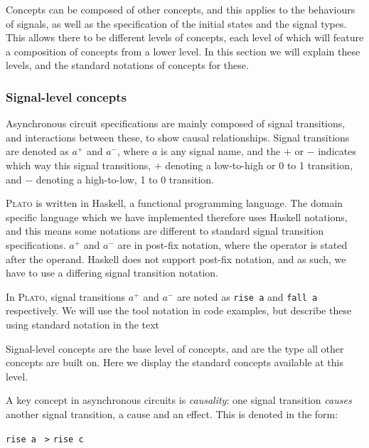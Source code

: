 \documentclass[british,conference,compsoc]{IEEEtran}
\newcommand{\noun}[1]{\textsc{#1}}
\begin{document}
Concepts can be composed of other concepts, and this applies to the behaviours 
of signals, as well as the specification of the initial states and the signal 
types. This allows there to be different levels of concepts, each level of 
which will feature a composition of concepts from a lower level. In this section we will explain these levels, and the standard notations of 
concepts for these. 

\vspace{-3mm}

\subsubsection{\label{signal-level}Signal-level concepts}Asynchronous circuit 
specifications are mainly composed of signal transitions, and interactions 
between these, to show causal relationships. Signal transitions are denoted as 
$a^{+}$ and $a^{-}$, where $a$ is any signal name, and 
the $+$ or $-$ indicates which way this signal transitions, $+$ denoting a 
low-to-high or 0 to 1 transition, and $-$ denoting a high-to-low, 1 to 0 
transition. 

\noun{Plato} is written in Haskell, a functional programming language. The 
domain specific language which we have implemented therefore uses Haskell 
notations, and this means some notations are different to standard signal 
transition specifications. $a^{+}$ and $a^{-}$ are in post-fix notation, where 
the operator is stated after the operand. Haskell does not support post-fix 
notation, and as such, we have to use a differing signal transition notation. 

In \noun{Plato}, signal transitions $a^{+}$ and $a^{-}$ are noted as \texttt{rise a} and 
\texttt{fall a} respectively. We will use the tool notation in code examples, but describe these using standard notation in the text

Signal-level concepts are the base level of concepts, and are 
the type all other concepts are built on. Here we display the standard concepts
available at this level.

A key concept in asynchronous circuits is \emph{causality}:
one signal transition \emph{causes} another signal transition, a cause and an 
effect. This is denoted in the form: 

\vspace{-2mm}

\begin{center}
{\texttt{rise a} \texttt{~>} \texttt{rise c}}
\end{center}
\end{document}
